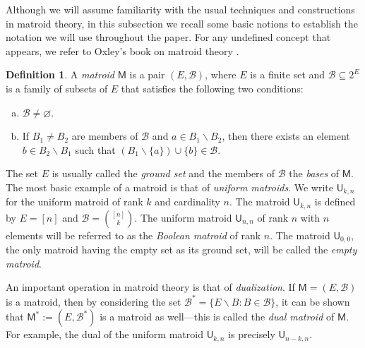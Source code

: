 \documentclass[11pt, a4paper, english]{amsart}
\theoremstyle{teoremas}
\theoremstyle{definition}
\newtheorem{definition}[theorem]{Definition}
\newcommand{\M}{\mathsf{M}}
\newcommand{\U}{\mathsf{U}}
\begin{document}
Although we will assume familiarity with the usual techniques and constructions in matroid theory, in this subsection we recall some basic notions to establish the notation we will use throughout the paper. For any undefined concept that appears, we refer to Oxley's book on matroid theory \cite{oxley}. 

\begin{definition}
    A \emph{matroid} $\M$ is a pair $(E,\mathscr{B})$, where $E$ is a finite set and $\mathscr{B}\subseteq 2^E$ is a family of subsets of $E$ that satisfies the following two conditions:
    \begin{enumerate}[(a)]
        \item $\mathscr{B}\neq \varnothing$.
        \item If $B_1\neq B_2$ are members of $\mathscr{B}$ and $a\in B_1\smallsetminus B_2$, then there exists an element $b\in B_2\smallsetminus B_1$ such that $(B_1\smallsetminus \{a\})\cup \{b\}\in \mathscr{B}$.
    \end{enumerate}
\end{definition}

The set $E$ is usually called the \emph{ground set} and the members of $\mathscr{B}$ the \emph{bases} of $\M$. The most basic example of a matroid is that of \emph{uniform matroids}. We write $\U_{k,n}$ for the uniform matroid of rank $k$ and cardinality $n$. The matroid $\U_{k,n}$ is defined by $E=[n]$ and $\mathscr{B} = \binom{[n]}{k}$. The uniform matroid $\U_{n,n}$ of rank $n$ with $n$ elements will be referred to as the \emph{Boolean matroid} of rank $n$. The matroid $\U_{0,0}$, the only matroid having the empty set as its ground set, will be called the \emph{empty matroid}.

An important operation in matroid theory is that of \emph{dualization}. If $\M = (E,\mathscr{B})$ is a matroid, then by considering the set $\mathscr{B}^*=\{E\smallsetminus B: B\in\mathscr{B}\}$, it can be shown that $\M^*:= (E,\mathscr{B}^*)$ is a matroid as well---this is called the \emph{dual matroid} of $\M$. For example, the dual of the uniform matroid $\U_{k,n}$ is precisely $\U_{n-k,n}$.
 
\end{document}
